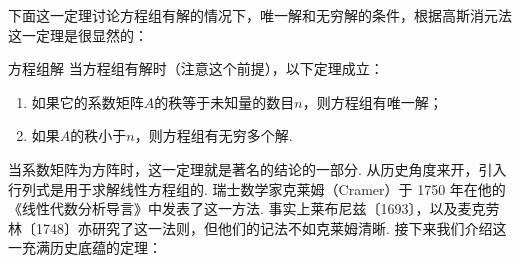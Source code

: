 下面这一定理讨论方程组有解的情况下，唯一解和无穷解的条件，根据高斯消元法这一定理是很显然的：
\begin{theorem}{}{方程组解}
    当方程组有解时（注意这个前提），以下定理成立：
    \begin{enumerate}
        \item 如果它的系数矩阵$A$的秩等于未知量的数目$n$，则方程组有唯一解；

        \item 如果$A$的秩小于$n$，则方程组有无穷多个解.
    \end{enumerate}
\end{theorem}

当系数矩阵为方阵时，这一定理就是著名的结论的一部分. 从历史角度来开，引入行列式是用于求解线性方程组的. 瑞士数学家克莱姆（Cramer）于 1750 年在他的《线性代数分析导言》中发表了这一方法. 事实上莱布尼兹〔1693〕，以及麦克劳林〔1748〕亦研究了这一法则，但他们的记法不如克莱姆清晰. 接下来我们介绍这一充满历史底蕴的定理：
